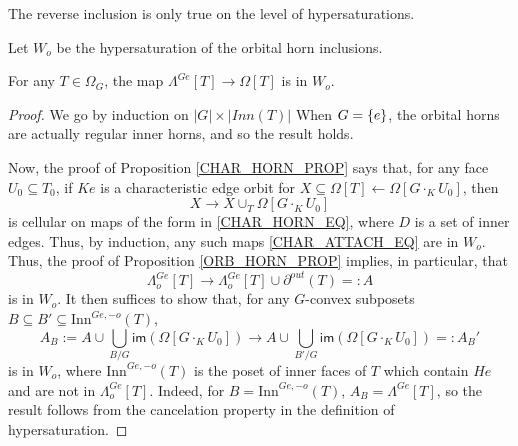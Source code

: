 \documentclass[a4paper,10pt,draft]{article}%
\numberwithin{equation}{section}%
\begin{document}
The reverse inclusion is only true on the level of hypersaturations.
\begin{definition}
      Let $W_o$ be the hypersaturation of the orbital horn inclusions.
\end{definition}

\begin{proposition}
      \label{HORN_ORB_PROP}
      For any $T \in \Omega_G$, the map
      $\Lambda^{G e}[T] \to \Omega[T]$
      is in $W_o$.
\end{proposition}
\begin{proof}
      We go by induction on $|G| \times |Inn(T)|$ 
      When $G = \left\{e\right\}$, the orbital horns are actually regular inner horns, and so the result holds.

      Now, the proof of Proposition \ref{CHAR_HORN_PROP} says that,
      for any face $U_0 \subseteq T_0$,
      if $K e$ is a characteristic edge orbit for $X \subseteq \Omega[T] \leftarrow \Omega[G \cdot_K U_0]$, then
      \begin{equation}
            \label{CHAR_ATTACH_EQ}
            X \to X \cup_T \Omega[G \cdot_K U_0]
      \end{equation}
      is cellular on maps of the form in \eqref{CHAR_HORN_EQ}, where $D$ is a set of inner edges.
      Thus, by induction, any such maps \eqref{CHAR_ATTACH_EQ} are in $W_o$.
      Thus, the proof of Proposition \ref{ORB_HORN_PROP} implies, in particular, that
      \begin{equation}
            \Lambda^{G e}_o[T] \to \Lambda^{G e}_o[T] \cup \partial^{out}(T) =: A
      \end{equation}
      is in $W_o$.
      It then suffices to show that, for any $G$-convex subposets $B \subseteq B' \subseteq \mathrm{Inn}^{G e,-o}(T)$,
      \begin{equation}
            \label{ORB_HORN_ATTACH_EQ}
            A_B := A \cup \mathop{\bigcup}\limits_{B/G}\mathsf{im}\left(\Omega[G \cdot_{K} U_0]\right)
            \to
            A \cup \mathop{\bigcup}\limits_{B'/G}\mathsf{im}\left(\Omega[G \cdot_{K} U_0]\right) =: A_B'
      \end{equation}
      is in $W_o$,
      where $\mathrm{Inn}^{G e,-o}(T)$ is the poset of inner faces of $T$ which contain $H e$ and are not in $\Lambda^{G e}_o[T]$.
      Indeed, for $B = \mathrm{Inn}^{G e,-o}(T)$, $A_B = \Lambda^{G e}[T]$,
      so the result follows from the cancelation property in the definition of hypersaturation.


\end{proof}
\end{document}
